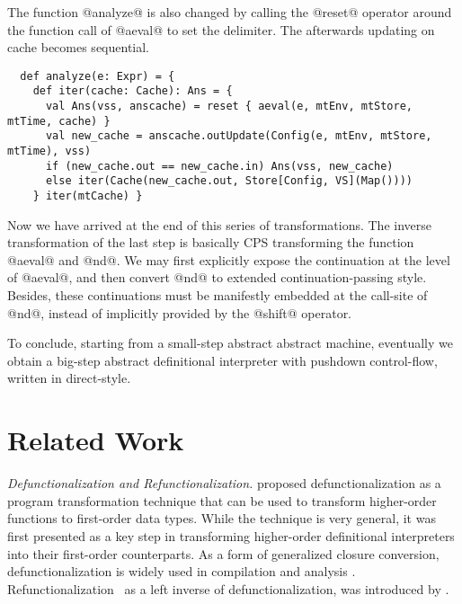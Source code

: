 \documentclass[acmsmall, review]{acmart}\settopmatter{}
\begin{document}
The function @analyze@ is also changed by calling the @reset@ operator around the function 
call of @aeval@ to set the delimiter. The afterwards updating on cache becomes sequential.

\begin{lstlisting}
  def analyze(e: Expr) = {
    def iter(cache: Cache): Ans = {
      val Ans(vss, anscache) = reset { aeval(e, mtEnv, mtStore, mtTime, cache) }
      val new_cache = anscache.outUpdate(Config(e, mtEnv, mtStore, mtTime), vss)
      if (new_cache.out == new_cache.in) Ans(vss, new_cache)
      else iter(Cache(new_cache.out, Store[Config, VS](Map())))
    } iter(mtCache) }
\end{lstlisting}

Now we have arrived at the end of this series of transformations. 
The inverse transformation of the last step is basically CPS transforming the function @aeval@ and @nd@.
We may first explicitly expose the continuation at the level of @aeval@, and then convert @nd@ 
to extended continuation-passing style. Besides, these continuations must be manifestly embedded
at the call-site of @nd@, instead of implicitly provided by the @shift@ operator.

To conclude, starting from a small-step abstract abstract machine, eventually we obtain a 
big-step abstract definitional interpreter with pushdown control-flow, written in direct-style.


\section{Related Work}\label{sec:related}

\textit{Defunctionalization and Refunctionalization.}
\citet{Reynolds:72} proposed defunctionalization as a program transformation 
technique that can be used to transform higher-order functions to first-order data types. 
While the technique is very general, it was first presented as a key step in
transforming higher-order definitional interpreters into their first-order 
counterparts.
As a form of generalized closure conversion,
defunctionalization is widely used in compilation and analysis \cite{pottier2006polymorphic, 
Eisenberg:2014:PFT:2633357.2633361, fourtounis2014modular, 10.1007/3-540-46425-5_4, consel1993tour}.
Refunctionalization~\cite{Danvy:2006:RW:2171265.2171268} as a 
left inverse of defunctionalization, was introduced 
by \citeauthor{Danvy:2006:RW:2171265.2171268,DANVY2009534}.
\end{document}
